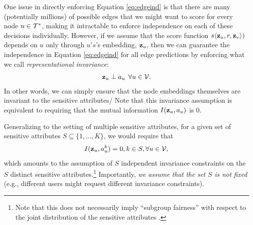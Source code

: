 One issue in directly enforcing Equation \eqref{eq:edgeind} is that there are many (potentially millions) of possible edges that we might want to score for every node $u \in \mathcal{T}^*$, making it intractable to enforce independence on each of these decisions individually.
However, if we assume that the score function $s\langle \mathbf{z}_u, r, \mathbf{z}_v \rangle)$ depends on $u$ only through $u's$'s embedding, $\mathbf{z}_u$, then we can guarantee the independence in Equation \eqref{eq:edgeind} for all edge predictions by enforcing what we call {\em representational invariance}:
\begin{equation}\label{eq:repinvar}
    \mathbf{z}_u \perp a_u \:\: \forall u \in \mathcal{V}.
\end{equation}
In other words, we can simply ensure that the node embeddings themselves are invariant to the sensitive attributes/%
Note that this invariance assumption is equivalent to requiring that the mutual information $I(\mathbf{z}_u, a_u)$ is $0$.

Generalizing to the setting of multiple sensitive attributes, for a given set of sensitive attributes $S \subseteq \{1, ..., K\}$, we would require that
\begin{equation}\label{eq:multirepinvar}
     I(\mathbf{z}_u, a^k_u) =0, k\in S, \forall u \in \mathcal{V},
\end{equation}
which amounts to the assumption of $S$ independent invariance constraints on the $S$ distinct sensitive attributes.\footnote{Note that this does not necessarily imply ``subgroup fairness'' with respect to the joint distribution of the sensitive attributes \cite{kearns2017preventing}.}
Importantly, {\em we assume that the set $S$ is not fixed} (e.g., different users might request different invariance constraints). 

